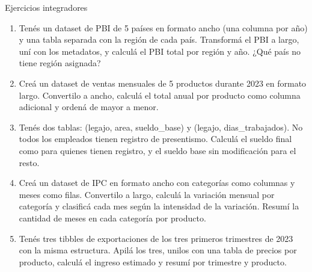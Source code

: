 \documentclass[8pt]{beamer}
\begin{document}
	\begin{frame}[fragile]{Ejercicios integradores}
		\begin{enumerate}[start=22]
			\item Tenés un dataset de PBI de 5 países en formato ancho (una columna por año) y una tabla separada con la región de cada país. Transformá el PBI a largo, uní con los metadatos, y calculá el PBI total por región y año. ¿Qué país no tiene región asignada?

			\item Creá un dataset de ventas mensuales de 5 productos durante 2023 en formato largo. Convertilo a ancho, calculá el total anual por producto como columna adicional y ordená de mayor a menor.

			\item Tenés dos tablas:  (legajo, area, sueldo\_base) y  (legajo, dias\_trabajados). No todos los empleados tienen registro de presentismo. Calculá el sueldo final como  para quienes tienen registro, y el sueldo base sin modificación para el resto.

			\item Creá un dataset de IPC en formato ancho con categorías como columnas y meses como filas. Convertilo a largo, calculá la variación mensual por categoría y clasificá cada mes según la intensidad de la variación. Resumí la cantidad de meses en cada categoría por producto.

			\item Tenés tres tibbles de exportaciones de los tres primeros trimestres de 2023 con la misma estructura. Apilá los tres, unilos con una tabla de precios por producto, calculá el ingreso estimado y resumí por trimestre y producto.
		\end{enumerate}
	\end{frame}
\end{document}
